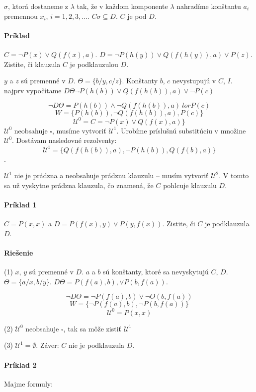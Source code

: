 $\sigma$, ktorá dostaneme z $\lambda$ tak, že v každom komponente $\lambda$
nahradíme  konštantu $a_i$ premennou $x_i$, $i=1, 2, 3, \ldots$. $C\sigma
\subseteq D$. $C$ je pod $D$.

\paragraph{Príklad} $C = \neg P(x) \lor Q(f(x), a)$. $D = \neg P(h(y)) \lor
Q(f(h(y)),a) \lor P(z)$. Zistite, či klauzula $C$ je podklauzulou $D$.

\par $y$ a $z$ sú premenné v $D$. $\Theta = \{ b/y, c/z\}$. Konštanty $b$, $c$
nevystupujú v $C$, $I$. najprv vypočítame $D\Theta \neg P(h(b)) \lor
Q(f(h(b)),a) \lor \neg P(c)$

$$\neg D \Theta = P(h(b)) \land \neg Q(f(h(b)),a) \ lor P(c)$$
$$W = \{P(h(b)), \neg Q(f(h(b)),a), P(c) \}$$
$$\mathcal{U}^0 = C = \neg P(x) \lor Q(f(x),a)\}$$
$\mathcal{U}^0$ neobsahuje $\square$, musíme vytvoriť $\mathcal{U}^1$. Urobíme
príslušnú substitúciu v množine $\mathcal{U}^0$. Dostávam nasledovné rezolventy:
$$\mathcal{U}^1 = \{ Q(f(h(b)),a), \neg P(h(b)), Q(f(b),a)\}$$. 
\par
$\mathcal{U}^1$
nie je prádzna a neobsahuje prádznu klauzulu -- musím vytvoriť $\mathcal{U}^2$.
V tomto sa už vyskytne prádzna klauzula, čo znamená, že $C$ pohlcuje klauzulu
$D$.


\paragraph{Príklad 1} $C=P(x,x)$ a $D=P(f(x),y) \lor P(y,f(x))$. Zistite, či $C$
je podklauzula $D$.

\paragraph{Riešenie} (1) $x$, $y$ sú premenné v $D$. $a$ a $b$ sú konštanty,
ktoré sa nevyskytujú $C$, $D$. $\Theta = \{ a/x, b/y\}$. $D\Theta = P(f(a),b), \lor P(b,
f(a))$.

$$\neg D\Theta = \neg P(f(a),b) \lor \neg O(b,f(a))$$
$$W = \{ \neg P(f(a),b), \neg P(b,f(a))\}$$
$$\mathcal{U}^0 = P(x,x)$$


\par (2) $\mathcal{U}^0$ neobsahuje $\square$, tak sa môže zistiť
$\mathcal{U}^1$
\par (3) $\mathcal{U}^1 = \emptyset$. Záver: $C$ nie je podklauzula $D$.


\paragraph{Príklad 2} Majme formuly:

